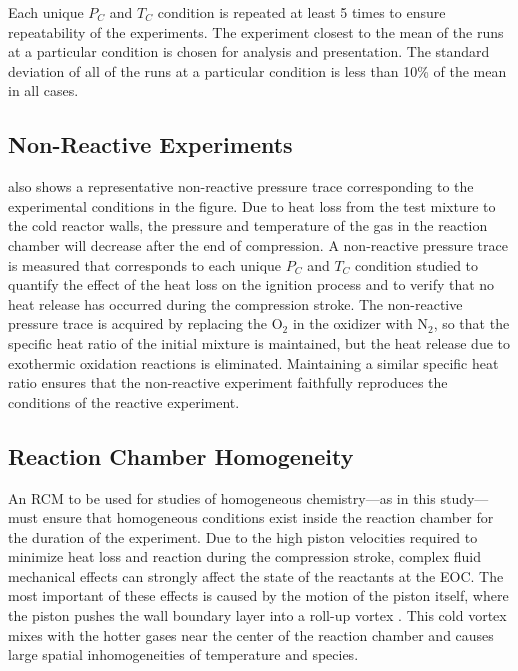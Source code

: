 \documentclass[../main.tex]{subfiles}
\begin{document}
Each unique $P_C$ and $T_C$ condition is repeated at least 5 times to
ensure repeatability of the experiments. The experiment closest to the
mean of the runs at a particular condition is chosen for analysis and
presentation. The standard deviation of all of the runs at a particular
condition is less than 10\% of the mean in all cases.

\subsection{Non-Reactive Experiments}

 also shows a representative non-reactive pressure
trace corresponding to the experimental conditions in the figure.
Due to heat loss from the test mixture to the cold reactor walls,
the pressure and temperature of the gas in the reaction chamber will
decrease after the end of compression. A non-reactive pressure trace
is measured that corresponds to each unique $P_C$ and $T_C$ condition
studied to quantify the effect of the heat loss on the ignition process
and to verify that no heat release has occurred during the compression
stroke. The non-reactive pressure trace is acquired by replacing the
O$_2$ in the oxidizer with N$_2$, so that the specific heat ratio
of the initial mixture is maintained, but the heat release due to
exothermic oxidation reactions is eliminated. Maintaining a similar
specific heat ratio ensures that the non-reactive experiment faithfully
reproduces the conditions of the reactive experiment.


\subsection{Reaction Chamber Homogeneity}

An RCM to be used for studies of homogeneous chemistry---as in this study---%
must ensure that homogeneous conditions exist inside the reaction
chamber for the duration of the experiment. Due to the high piston
velocities required to minimize heat loss and reaction during the
compression stroke, complex fluid mechanical effects can strongly
affect the state of the reactants at the EOC. The most important of these
effects is caused by the motion of the piston itself, where the piston
pushes the wall boundary layer into a roll-up vortex \cite{Lee1998}.
This cold vortex mixes with the hotter gases near the center of
the reaction chamber and causes large spatial inhomogeneities of
temperature and species.
\end{document}

